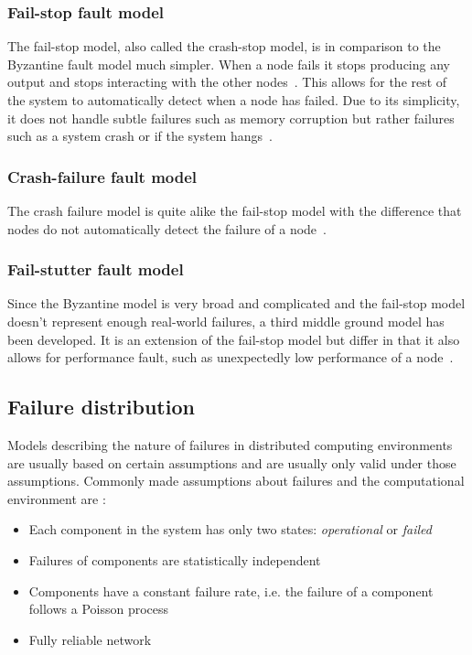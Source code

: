 \documentclass{cslthse-msc}
\begin{document}
\subsubsection{Fail-stop fault model} \label{subsub:background_fail_stop}
The fail-stop model, also called the crash-stop model, is in comparison to the Byzantine fault model much simpler. When a node fails it stops producing any output and stops interacting with the other nodes~\cite{faultTolerantFundamentals}. This allows for the rest of the system to automatically detect when a node has failed. Due to its simplicity, it does not handle subtle failures such as memory corruption but rather failures such as a system crash or if the system hangs~\cite{surveyFaultParallel}.

\subsubsection{Crash-failure fault model}
The crash failure model is quite alike the fail-stop model with the difference that nodes do not automatically detect the failure of a node~\cite{faultTolerantFundamentals, adaptiveAgentReplication}.

\subsubsection{Fail-stutter fault model}
Since the Byzantine model is very broad and complicated and the fail-stop model doesn't represent enough real-world failures, a third middle ground model has been developed. It is an extension of the fail-stop model but differ in that it also allows for performance fault, such as unexpectedly low performance of a node~\cite{surveyFaultParallel}.

\subsection{Failure distribution} \label{subsec:background_failure_distribution}
Models describing the nature of failures in distributed computing environments are usually based on certain assumptions and are usually only valid under those assumptions. Commonly made assumptions about failures and the computational environment are \cite{relModelDistSimSystem, relModelAnalysis, cloudServiceRel, studyServiceRel, hierarchicalRelModeling, selfAdaptRel}:
\begin{itemize}
	\item Each component in the system has only two states: \emph{operational} or \emph{failed}
	\item Failures of components are statistically independent
	\item Components have a constant failure rate, i.e. the failure of a component follows a Poisson process
	\item Fully reliable network
\end{itemize}
\end{document}
